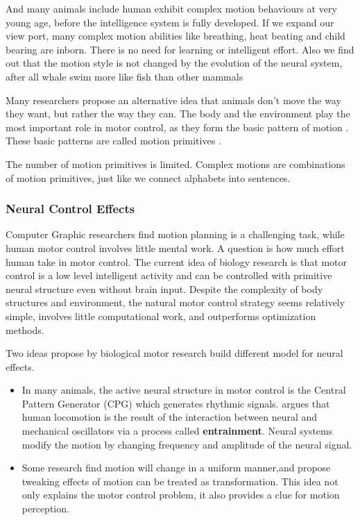 And many animals include human exhibit complex motion behaviours at very young age, before the intelligence system is fully developed.
If we expand our view port, many complex motion abilities like breathing, heat beating and child bearing are inborn.
There is no need for learning or intelligent effort.
Also we find out that the motion style is not changed by the evolution of the neural system, after all whale swim more like fish than other mammals

Many researchers propose an alternative idea that animals don’t move the way they want, but rather the way they can. 
The body and the environment play the most important role in motor control, as they form the basic pattern of motion \citep{nishikawa2007neuromechanics}.
These basic patterns are called motion primitives \citep{Poggio2004}.

The number of motion primitives is limited.
Complex motions are combinations of motion primitives, just like we connect alphabets into sentences.




\subsubsection*{Neural Control Effects}
Computer Graphic researchers find motion planning is a challenging task, while human motor control involves little mental work.
A question is how much effort human take in motor control.
The current idea of biology research is that motor control is a low level intelligent activity and can be controlled with primitive neural structure even without brain input. 
Despite the complexity of body structures and environment, the natural motor control strategy seems relatively simple, involves little computational work, and outperforms optimization methods. 

Two ideas propose by biological motor research build different model for neural effects.
\begin{itemize}
\item
In many animals, the active neural structure in motor control is the Central Pattern Generator (CPG) which generates rhythmic signals.
\citet{Cohen1988a} argues that human locomotion is the result of the interaction between neural and mechanical oscillators via a process called \textbf{entrainment}.
Neural systems modify the motion by changing frequency and amplitude of the neural signal.

\item
Some research find motion will change in a uniform manner\citep{Viviani1992},and propose tweaking effects of motion can be treated as transformation\citep{flash2007affine}.
This idea not only explains the motor control problem, it also provides a clue for motion perception.

\end{itemize}





